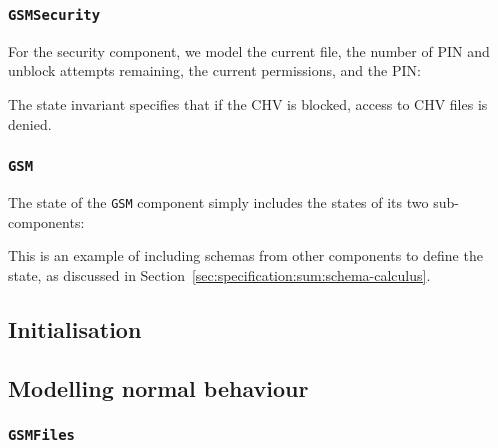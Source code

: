 \subsubsection*{\texttt{GSMSecurity}}

For the security component, we model the current file, the number of PIN and unblock attempts remaining, the current permissions, and the PIN:



The state invariant specifies that if the CHV is blocked, access to CHV files is denied.

\subsubsection*{\texttt{GSM}}

The state of the \texttt{GSM} component simply includes the states of its two sub-components:



This is an example of including schemas from other components to define the state, as discussed in Section~\ref{sec:specification:sum:schema-calculus}.

\subsection{Initialisation}







\subsection{Modelling normal behaviour}

\subsubsection*{\texttt{GSMFiles}}

